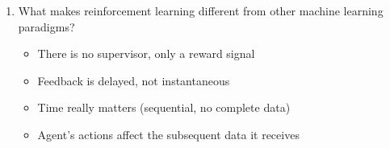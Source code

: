 \documentclass[12pt]{article}
\newenvironment{QandA}{\begin{enumerate}[label=\bfseries\arabic*.]\bfseries}
{\end{enumerate}}
\newenvironment{answered}{\par\normalfont\color{Sepia}}{}
\begin{document}
\begin{QandA}
    \item What makes reinforcement learning different from other machine learning paradigms?
    \begin{answered}
        \begin{itemize}
            \item There is no supervisor, only a reward signal
            \item Feedback is delayed, not instantaneous
            \item Time really matters (sequential, no complete data)
            \item Agent’s actions affect the subsequent data it receives
        \end{itemize}
    \end{answered}

\end{QandA}
\end{document}
